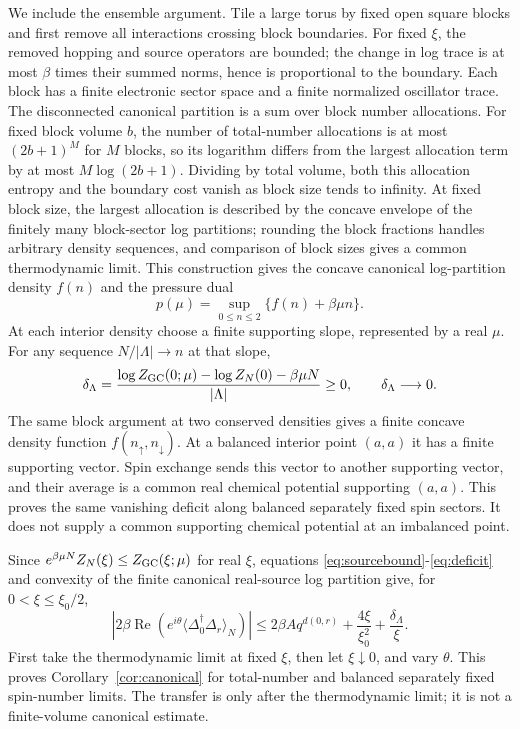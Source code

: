 \documentclass[11pt]{article}
\newcommand{\Deltaop}{\Delta}
\begin{document}
We include the ensemble argument. Tile a large torus by fixed open square blocks and first remove all interactions crossing block boundaries. For fixed $\xi$, the removed hopping and source operators are bounded; the change in log trace is at most $\beta$ times their summed norms, hence is proportional to the boundary. Each block has a finite electronic sector space and a finite normalized oscillator trace. The disconnected canonical partition is a sum over block number allocations. For fixed block volume $b$, the number of total-number allocations is at most $(2b+1)^M$ for $M$ blocks, so its logarithm differs from the largest allocation term by at most $M\log(2b+1)$. Dividing by total volume, both this allocation entropy and the boundary cost vanish as block size tends to infinity. At fixed block size, the largest allocation is described by the concave envelope of the finitely many block-sector log partitions; rounding the block fractions handles arbitrary density sequences, and comparison of block sizes gives a common thermodynamic limit. This construction gives the concave canonical log-partition density $f(n)$ and the pressure dual
\[
 p(\mu)=\sup_{0\le n\le2}\{f(n)+\beta\mu n\}.
\]
At each interior density choose a finite supporting slope, represented by a real $\mu$. For any sequence $N/|\Lambda|\to n$ at that slope,
\begin{equation}\label{eq:deficit}
 \delta_\Lambda=\frac{\log Z_{\rm GC}(0;\mu)-\log Z_N(0)-\beta\mu N}
 {|\Lambda|}\ge0,\qquad \delta_\Lambda\longrightarrow0.
\end{equation}
The same block argument at two conserved densities gives a finite concave density function $f(n_\uparrow,n_\downarrow)$. At a balanced interior point $(a,a)$ it has a finite supporting vector. Spin exchange sends this vector to another supporting vector, and their average is a common real chemical potential supporting $(a,a)$. This proves the same vanishing deficit along balanced separately fixed spin sectors. It does not supply a common supporting chemical potential at an imbalanced point.

Since $e^{\beta\mu N}Z_N(\xi)\le Z_{\rm GC}(\xi;\mu)$ for real $\xi$, equations \eqref{eq:sourcebound}-\eqref{eq:deficit} and convexity of the finite canonical real-source log partition give, for $0<\xi\le\xi_0/2$,
\[
 \left|2\beta\operatorname{Re}\left(e^{i\theta}
 \langle\Deltaop_0^\dagger\Deltaop_r\rangle_N\right)\right|
 \le 2\beta A q^{d(0,r)}+\frac{4\xi}{\xi_0^2}+\frac{\delta_\Lambda}{\xi}.
\]
First take the thermodynamic limit at fixed $\xi$, then let $\xi\downarrow0$, and vary $\theta$. This proves Corollary~\ref{cor:canonical} for total-number and balanced separately fixed spin-number limits. The transfer is only after the thermodynamic limit; it is not a finite-volume canonical estimate.
\end{document}
